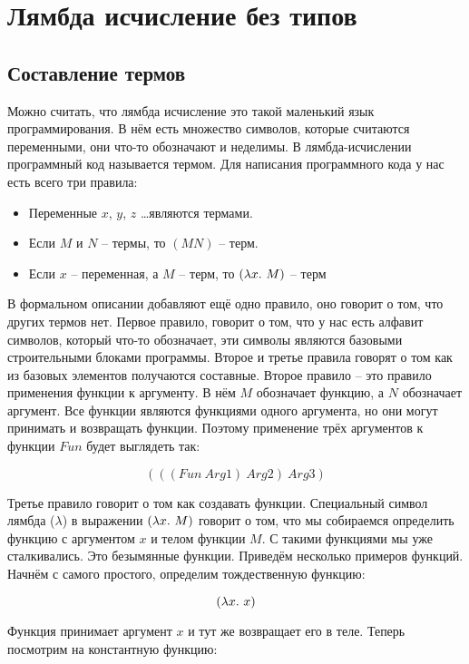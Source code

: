 \section{Лямбда исчисление без типов}

\subsection{Составление термов}

Можно считать, что лямбда исчисление это такой маленький
язык программирования. В нём есть множество 
символов, которые считаются переменными, они что-то обозначают и 
неделимы. В лямбда-исчислении программный код называется термом.
Для написания программного кода у нас есть всего три правила:

\begin{itemize}

\item Переменные $x$, $y$, $z$ \dots являются термами.
\item Если $M$ и $N$ -- термы, то $(MN)$ -- терм.
\item Если $x$ -- переменная, а $M$ -- терм, то $(\lambda x .\  M)$ -- терм

\end{itemize}

В формальном описании добавляют ещё одно правило, оно
говорит о том, что других термов нет. Первое правило,
говорит о том, что у нас есть алфавит символов, который
что-то обозначает, эти символы являются базовыми строительными
блоками программы. Второе и третье правила говорят о том 
как из базовых элементов получаются составные. Второе
правило -- это правило применения функции к аргументу. 
В нём $M$ обозначает функцию, а $N$ обозначает аргумент. 
Все функции являются функциями одного аргумента, но они могут
принимать и возвращать функции. Поэтому применение
трёх аргументов к функции $Fun$ будет выглядеть так: 

\[ (((Fun\ Arg1)\ Arg2)\ Arg3) \] 

Третье правило говорит о том как создавать функции. 
Специальный символ лямбда ($\lambda$) в выражении $(\lambda x .\  M)$
говорит о том, что мы собираемся определить функцию с аргументом
$x$ и телом функции $M$. С такими функциями мы уже сталкивались. 
Это безымянные функции. Приведём несколько примеров функций.
Начнём с самого простого, определим тождественную функцию:

\[ (\lambda x .\  x) \]

Функция принимает аргумент $x$ и тут же возвращает его в теле.
Теперь посмотрим на константную функцию:

